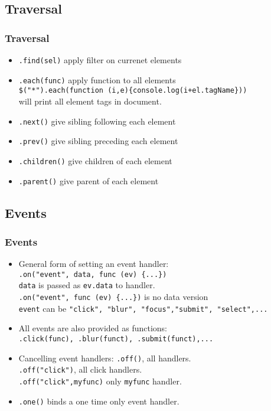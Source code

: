 \documentclass[trans,compress,xcolor=table]{beamer}
\begin{document}
\subsection*{Traversal}
\begin{frame}[fragile]
\frametitle{Traversal}
\begin{itemize}
\item \lstinline!.find(sel)! apply filter on currenet elements
\item \lstinline!.each(func)! apply function to all elements\\
	\lstinline!$("*").each(function (i,e){console.log(i+el.tagName}))! \\
	will print all element tags in document.
\item \lstinline!.next()! give sibling following each element
\item \lstinline!.prev()! give sibling preceding each element
\item \lstinline!.children()! give children of each element
\item \lstinline!.parent()! give parent of each element
\end{itemize}
\end{frame}


\subsection*{Events}
\begin{frame}[fragile]
\frametitle{Events}
\begin{itemize}
\item General form of setting an event handler:\\
	\lstinline!.on("event", data, func (ev) {...})!\\
	\lstinline!data! is passed as \lstinline!ev.data! to handler.\\
	\lstinline!.on("event", func (ev) {...})! is no data version\\
	\lstinline!event! can be \lstinline!"click", "blur", "focus","submit", "select",...!
\item All events are also provided as functions:\\
	\lstinline!.click(func), .blur(funct), .submit(funct),...!
\item Cancelling event handlers: \lstinline!.off()!, all handlers.\\
	 \lstinline!.off("click")!, all click handlers.\\
	\lstinline!.off("click",myfunc)! only \lstinline!myfunc! handler.
\item \lstinline!.one()! binds a one time only event handler.
\end{itemize}
\end{frame}
\end{document}
